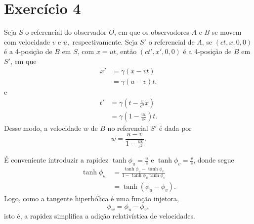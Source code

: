 \documentclass[12pt,a4paper]{article}
\numberwithin{equation}{section}
\begin{document}
\section*{Exercício 4}
Seja \(S\) o referencial do observador \(O\), em que os observadores \(A\) e \(B\) se movem com velocidade \(v\) e \(u,\) respectivamente. Seja \(S'\) o referencial de \(A\), se \((ct, x, 0, 0)\) é a 4-posição de \(B\) em \(S\), com \(x = ut\), então \((ct', x', 0, 0)\) é a 4-posição de \(B\) em \(S'\), em que
\begin{align*}
    x' &= \gamma \left(x - vt\right)\\
       &= \gamma (u - v)t.
\end{align*}
e
\begin{align*}
    t' &= \gamma \left(t - \frac{v}{c^2}x\right)\\
       &= \gamma \left(1 - \frac{uv}{c^2}\right)t.
\end{align*}
Desse modo, a velocidade \(w\) de \(B\) no referencial \(S'\) é dada por
\begin{equation*}
    w = \frac{u - v}{1 - \frac{uv}{c^2}}.
\end{equation*}


É conveniente introduzir a rapidez \(\tanh \phi_u = \frac{u}{c}\) e \(\tanh \phi_v = \frac{v}{c}\), donde segue
\begin{align*}
    \tanh \phi_w &= \frac{\tanh \phi_u - \tanh \phi_v}{1 - \tanh \phi_u \tanh \phi_v}\\
                 &= \tanh\left(\phi_u - \phi_v\right).
\end{align*}
Logo, como a tangente hiperbólica é uma função injetora,
\begin{equation*}
    \phi_w = \phi_u - \phi_v,
\end{equation*}
isto é, a rapidez simplifica a adição relativística de velocidades.
\end{document}
